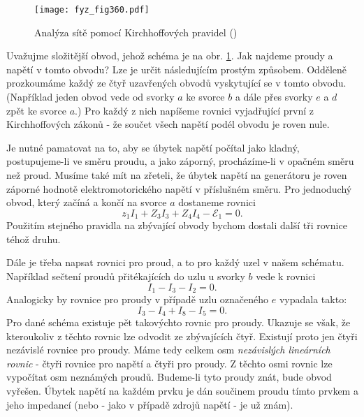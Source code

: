   \begin{figure}[ht!] %
    \centering
    \texttt{[image: fyz\_fig360.pdf]}
    \caption{Analýza sítě pomocí Kirchhoffových pravidel
             (\cite[s.~401]{Feynman02})}
    \label{fyz:fig360}
  \end{figure}
  
  Uvažujme složitější obvod, jehož schéma je na obr. \ref{fyz:fig360}. Jak najdeme proudy a napětí 
  v tomto obvodu? Lze je určit následujícím prostým způsobem. Odděleně prozkoumáme každý ze čtyř 
  uzavřených obvodů vyskytující se v tomto obvodu. (Například jeden obvod vede od svorky \(a\) ke 
  svorce \(b\) a dále přes svorky \(e\) a \(d\) zpět ke svorce \(a\).) Pro každý z nich napíšeme 
  rovnici vyjadřující první z Kirchhoffových zákonů - že součet všech napětí podél obvodu je roven 
  nule.
  
  Je nutné pamatovat na to, aby se úbytek napětí počítal jako kladný, postupujeme-li ve směru 
  proudu, a jako záporný, procházíme-li v opačném směru než proud. Musíme také mít na zřeteli, že 
  úbytek napětí na generátoru je roven záporné hodnotě elektromotorického napětí v příslušném 
  směru. Pro jednoduchý obvod, který začíná a končí na svorce \(a\) dostaneme rovnici
  \begin{equation*}
    z_1I_1 + Z_3I_3 + Z_4I_4 -\mathscr{E}_1 = 0.
  \end{equation*}
  Použitím stejného pravidla na zbývající obvody bychom dostali další tři rovnice téhož druhu. 
  
  Dále je třeba napsat rovnici pro proud, a to pro každý uzel v našem schématu. Například sečtení 
  proudů přitékajících do uzlu u svorky \(b\) vede k rovnici
  \begin{equation*}
    I_1 - I_3 - I_2 = 0.
  \end{equation*}
  Analogicky by rovnice pro proudy v případě uzlu označeného \(e\) vypadala takto:
  \begin{equation*}
    I_3 - I_4 + I_8 - I_5 = 0.
  \end{equation*}
  Pro dané schéma existuje pět takovýchto rovnic pro proudy. Ukazuje se však, že kteroukoliv z 
  těchto rovnic lze odvodit ze zbývajících čtyř. Existují proto jen čtyři nezávislé rovnice pro 
  proudy. Máme tedy celkem osm \emph{nezávislých lineárních rovnic} - čtyři rovnice pro napětí 
  a čtyři pro proudy. Z těchto osmi rovnic lze vypočítat osm neznámých proudů. Budeme-li tyto 
  proudy znát, bude obvod vyřešen. Úbytek napětí na každém prvku je dán součinem proudu tímto 
  prvkem a jeho impedancí (nebo - jako v případě zdrojů napětí - je už znám). 
  

